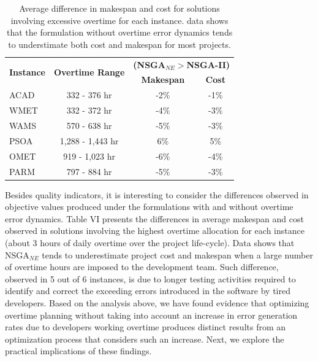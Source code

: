 \documentclass[conference]{IEEEtran}
\begin{document}
\begin{table}[htbp]
  \centering
  \caption{Average difference in makespan and cost for solutions involving excessive overtime for each instance. data shows that the formulation without overtime error dynamics tends to understimate both cost and makespan for most projects.}
    \begin{tabular}{rccc}
    \toprule
    \multicolumn{1}{c}{\multirow{2}[2]{*}{\textbf{Instance}}} & \multirow{2}[2]{*}{\textbf{Overtime  Range}} & \multicolumn{2}{c}{\textbf{(NSGA$_{NE}>$NSGA-II)}} \\

    \multicolumn{1}{c}{} &       & \textbf{Makespan } & \textbf{Cost} \\
        \midrule
    \multicolumn{1}{l}{ACAD} & 332 - 376 hr & -2\%  & -1\% \\
    \multicolumn{1}{l}{WMET} & 332 - 372 hr & -4\%  & -3\% \\
    \multicolumn{1}{l}{WAMS} & 570 - 638 hr & -5\%  & -3\% \\
    \multicolumn{1}{l}{PSOA} & 1,288 - 1,443 hr & 6\%   & 5\% \\
    \multicolumn{1}{l}{OMET} & 919 - 1,023 hr & -6\%  & -4\% \\
    \multicolumn{1}{l}{PARM} & 797 - 884 hr & -5\%  & -3\% \\
    \bottomrule
    \end{tabular}%
\end{table}%
Besides quality indicators, it is interesting to consider the differences observed in objective values produced under the formulations with and without overtime error dynamics. Table VI presents the differences in average makespan and cost observed in solutions involving the highest overtime allocation for each instance (about 3 hours of daily overtime over the project life-cycle). Data shows that NSGA$_{NE}$ tends to underestimate project cost and makespan when a large number of overtime hours are imposed to the development team. Such difference, observed in 5 out of 6 instances, is due to longer testing activities required to identify and correct the exceeding errors introduced in the software by tired developers.
Based on the analysis above, we have found evidence that optimizing overtime planning without taking into account an increase in error generation rates due to developers working overtime produces distinct results from an optimization process that considers such an increase. Next, we explore the practical implications of these findings.
\end{document}
